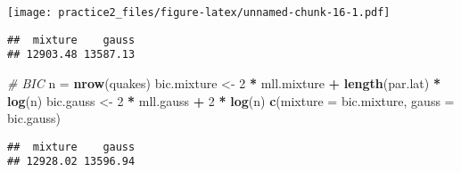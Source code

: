 \documentclass[
]{article}
\newenvironment{Shaded}{\begin{snugshade}}{\end{snugshade}}
\newcommand{\CommentTok}[1]{\textcolor[rgb]{0.56,0.35,0.01}{\textit{#1}}}
\newcommand{\DataTypeTok}[1]{\textcolor[rgb]{0.13,0.29,0.53}{#1}}
\newcommand{\DecValTok}[1]{\textcolor[rgb]{0.00,0.00,0.81}{#1}}
\newcommand{\KeywordTok}[1]{\textcolor[rgb]{0.13,0.29,0.53}{\textbf{#1}}}
\newcommand{\NormalTok}[1]{#1}
\newcommand{\OperatorTok}[1]{\textcolor[rgb]{0.81,0.36,0.00}{\textbf{#1}}}
\newcommand{\OtherTok}[1]{\textcolor[rgb]{0.56,0.35,0.01}{#1}}
\newcommand{\StringTok}[1]{\textcolor[rgb]{0.31,0.60,0.02}{#1}}
\begin{document}
\texttt{[image: practice2\_files/figure-latex/unnamed-chunk-16-1.pdf]}

\begin{Shaded}
\end{Shaded}

\begin{verbatim}
##  mixture    gauss 
## 12903.48 13587.13
\end{verbatim}

\begin{Shaded}
\begin{Highlighting}[]
\CommentTok{# BIC}
\NormalTok{n =}\StringTok{ }\KeywordTok{nrow}\NormalTok{(quakes)}
\NormalTok{bic.mixture <-}\StringTok{ }\DecValTok{2} \OperatorTok{*}\StringTok{ }\NormalTok{mll.mixture }\OperatorTok{+}\StringTok{ }\KeywordTok{length}\NormalTok{(par.lat) }\OperatorTok{*}\StringTok{ }\KeywordTok{log}\NormalTok{(n)}
\NormalTok{bic.gauss <-}\StringTok{ }\DecValTok{2} \OperatorTok{*}\StringTok{ }\NormalTok{mll.gauss }\OperatorTok{+}\StringTok{ }\DecValTok{2} \OperatorTok{*}\StringTok{ }\KeywordTok{log}\NormalTok{(n)}
\KeywordTok{c}\NormalTok{(}\DataTypeTok{mixture =}\NormalTok{ bic.mixture, }\DataTypeTok{gauss =}\NormalTok{ bic.gauss)}
\end{Highlighting}
\end{Shaded}

\begin{verbatim}
##  mixture    gauss 
## 12928.02 13596.94
\end{verbatim}
\end{document}
